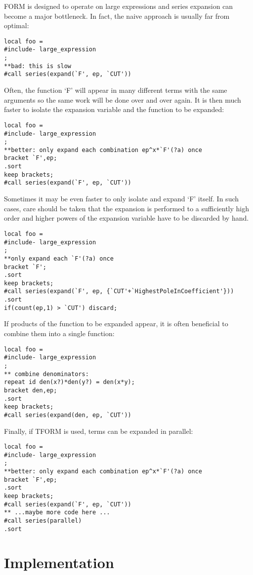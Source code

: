 \documentclass[titlepage]{article}
\begin{document}
FORM is designed to operate on large expressions and series expansion
can become a major bottleneck. In fact, the naive approach is usually
far from optimal:
\begin{lstlisting}
local foo =
#include- large_expression
;
**bad: this is slow
#call series(expand(`F', ep, `CUT'))
\end{lstlisting}
Often, the function `F' will appear in many different terms with the
same arguments so the same work will be done over and over again. It is
then much faster to isolate the expansion variable and the function to
be expanded:
\begin{lstlisting}
local foo =
#include- large_expression
;
**better: only expand each combination ep^x*`F'(?a) once
bracket `F',ep;
.sort
keep brackets;
#call series(expand(`F', ep, `CUT'))
\end{lstlisting}
Sometimes it may be even faster to only isolate and expand `F'
itself. In such cases, care should be taken that the expansion is
performed to a sufficiently high order and higher powers of the
expansion variable have to be discarded by hand.
\begin{lstlisting}
local foo =
#include- large_expression
;
**only expand each `F'(?a) once
bracket `F';
.sort
keep brackets;
#call series(expand(`F', ep, {`CUT'+`HighestPoleInCoefficient'}))
.sort
if(count(ep,1) > `CUT') discard;
\end{lstlisting}
If products of the function to be expanded appear, it is often
beneficial to combine them into a single function:
\begin{lstlisting}
local foo =
#include- large_expression
;
** combine denominators:
repeat id den(x?)*den(y?) = den(x*y);
bracket den,ep;
.sort
keep brackets;
#call series(expand(den, ep, `CUT'))
\end{lstlisting}
Finally, if TFORM is used, terms can be expanded in parallel:
\begin{lstlisting}
local foo =
#include- large_expression
;
**better: only expand each combination ep^x*`F'(?a) once
bracket `F',ep;
.sort
keep brackets;
#call series(expand(`F', ep, `CUT'))
** ...maybe more code here ...
#call series(parallel)
.sort
\end{lstlisting}


\appendix

\section{Implementation}
\label{sec:impl}
\end{document}
